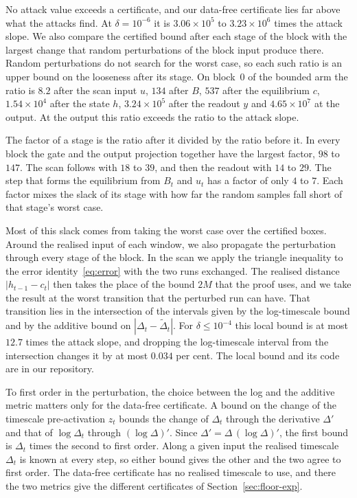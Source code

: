 \documentclass[11pt, a4paper]{article}
\theoremstyle{remark}
\theoremstyle{plain}
\begin{document}
No attack value exceeds a certificate, and our data-free certificate lies far above what the
attacks find. At $\delta = 10^{-6}$ it is $3.06 \times 10^{5}$ to $3.23 \times 10^{6}$ times the
attack slope. We also compare the certified bound after each stage of the block with the largest
change that random perturbations of the block input produce there. Random perturbations do not
search for the worst case, so each such ratio is an upper bound on the looseness after its stage.
On block~0 of the bounded arm the ratio is $8.2$ after the scan input $u$, $134$ after $B$, $537$
after the equilibrium $c$, $1.54 \times 10^{4}$ after the state $h$, $3.24 \times 10^{5}$ after the
readout $y$ and $4.65 \times 10^{7}$ at the output.
At the output this ratio exceeds the ratio to the attack slope.

The factor of a stage is the ratio after it divided by the ratio before it. In every block the
gate and the output projection together have the largest factor, $98$ to $147$. The scan follows
with $18$ to $39$, and then the readout with $14$ to $29$. The step that forms the equilibrium
from $B_t$ and $u_t$ has a factor of only $4$ to $7$. Each factor mixes the slack of its stage
with how far the random samples fall short of that stage's worst case.

Most of this slack comes from taking the worst case over the certified boxes. Around the realised
input of each window, we also propagate the perturbation through every stage of the block. In the
scan we apply the triangle inequality to the error identity~\eqref{eq:error} with the two runs
exchanged. The realised distance $|h_{t-1} - c_t|$ then takes the place of the bound $2M$ that the
proof uses, and we take the result at the worst transition that the perturbed run can have. That
transition lies in the intersection of the intervals given by the log-timescale bound and by the
additive bound on $|\Delta_t - \tilde\Delta_t|$. For $\delta \le 10^{-4}$ this local bound is at
most $12.7$ times the attack slope, and dropping the log-timescale interval from the intersection
changes it by at most $0.034$ per cent. The local bound and its code are in our repository.

To first order in the perturbation, the choice between the log and the additive metric matters
only for the data-free certificate. A bound on the change of the timescale pre-activation $z_t$
bounds the change of $\Delta_t$ through the derivative $\Delta'$ and that of $\log\Delta_t$ through
$(\log\Delta)'$. Since $\Delta' = \Delta\,(\log\Delta)'$, the first bound is $\Delta_t$ times the
second to first order. Along a given input the realised timescale $\Delta_t$ is known at every
step, so either bound gives the other and the two agree to first order. The data-free certificate
has no realised timescale to use, and there the two metrics give the different certificates of
Section~\ref{sec:floor-exp}.
\end{document}
